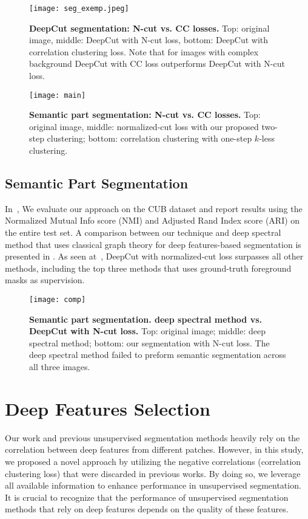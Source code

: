 \documentclass[10pt,twocolumn,letterpaper]{article}
\begin{document}
\begin{figure}[t]
\texttt{[image: seg\_exemp.jpeg]}
\caption{
\textbf{DeepCut segmentation: N-cut vs. CC losses.}  
Top: original image, middle: DeepCut with N-cut loss, bottom: DeepCut with correlation clustering loss. Note that for images with complex background DeepCut with CC loss outperforms DeepCut with N-cut loss.}
\label{fig:seg_ex}
\end{figure}

\begin{figure}[t]
\texttt{[image: main]}
\caption{
\textbf{Semantic part segmentation:  N-cut vs. CC losses.} Top: original image, middle: normalized-cut loss with our proposed two-step clustering; bottom: correlation clustering with one-step $k$-less clustering.}
\label{fig:main}
\end{figure}


\subsection{Semantic Part Segmentation}

In~, 
We evaluate our approach on the CUB dataset \cite{cub_2011} and report results using the Normalized Mutual Info score (NMI) and Adjusted Rand Index score (ARI) on the entire test set. A comparison between our technique and deep spectral method that uses classical graph theory for deep features-based segmentation\cite{bianchi2020spectral} is presented in . As seen at~, DeepCut with normalized-cut loss surpasses all other methods, including the top three methods\cite{hung2019scops,huang2020interpretable,choudhury2021unsupervised} that uses ground-truth foreground masks as supervision.


 \begin{figure}[t]
\texttt{[image: comp]}
\caption{
\textbf{Semantic part segmentation. deep spectral method vs. DeepCut with N-cut loss.} Top: original image; middle: deep spectral method\cite{melas2022deep}; bottom: our segmentation with N-cut loss. The deep spectral method failed to preform semantic segmentation across all three images.}
\label{fig:comp}
\end{figure}


\section{Deep Features Selection}\label{sec:deep_features}
Our work and previous unsupervised segmentation methods heavily rely on the correlation between deep features from different patches. However, in this study, we proposed a novel approach by utilizing the negative correlations (correlation clustering loss) that were discarded in previous works. By doing so, we leverage all available information to enhance performance in unsupervised segmentation. It is crucial to recognize that the performance of unsupervised segmentation methods that rely on deep features depends on the quality of these features.
\end{document}
